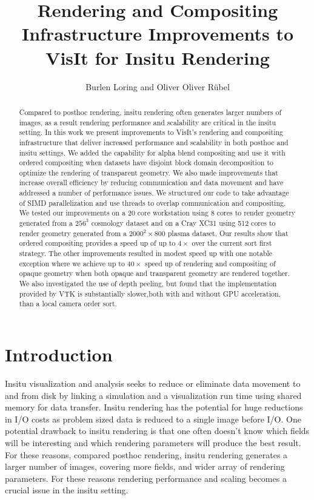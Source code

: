 \documentclass[a4paper,10pt]{report}
\title{Rendering and Compositing Infrastructure Improvements to VisIt for Insitu Rendering}
\author{Burlen Loring and Oliver Oliver R\"ubel}
\begin{document}
\maketitle

\begin{abstract}
Compared to posthoc rendering, insitu rendering often generates larger numbers of images, as a result rendering performance and scalability are critical in the insitu setting. In this work we present improvements to VisIt's rendering and compositing infrastructure that deliver increased performance and scalability in both posthoc and insitu settings. We added the capability for alpha blend compositing and use it with ordered compositing when datasets have disjoint block domain decomposition to optimize the rendering of transparent geometry. We also made improvements that increase overall efficiency by reducing communication and data movement and have addressed a number of performance issues. We structured our code to take advantage of SIMD parallelization and use threads to overlap communication and compositing. We tested our improvements on a 20 core workstation using 8 cores to render geometry generated from a $256^3$ cosmology dataset and on a Cray XC31 using 512 cores to render geometry generated from a $2000^2 \times 800$ plasma dataset. Our results show that ordered compositing provides a speed up of up to $4 \times$ over the current sort first strategy. The other improvements resulted in modest speed up with one notable exception where we achieve up to $40 \times$ speed up of rendering and compositing of opaque geometry when both opaque and transparent geometry are rendered together. We also investigated the use of depth peeling, but found that the implementation provided by VTK is substantially slower,both with and without GPU acceleration, than a local camera order sort.
\end{abstract}

\section{Introduction}
Insitu visualization and analysis seeks to reduce or eliminate data movement to and from disk by linking a simulation and a visualization run time using shared memory for data transfer. Insitu rendering has the potential for huge reductions in I/O costs as problem sized data is reduced to a single image before I/O. One potential drawback to insitu rendering is that one often doesn't know which fields will be interesting and which rendering parameters will produce the best result. For these reasons, compared posthoc rendering, insitu rendering generates a larger number of images, covering more fields, and wider array of rendering parameters. For these reasons rendering performance and scaling becomes a crucial issue in the insitu setting.
\end{document}
